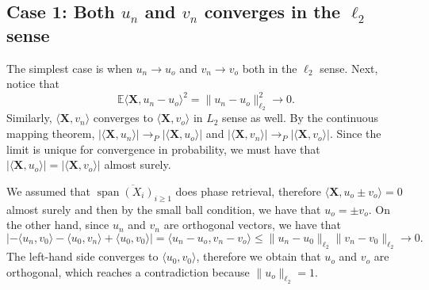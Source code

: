 \documentclass[a4paper,12pt]{amsart}
\numberwithin{equation}{section}
\newcommand{\X}{\mathbf X}
\DeclareMathOperator{\spn}{span}
\begin{document}
\subsection{Case 1: Both $u_n$ and $v_n$ converges in the $\ell_2$ sense}
The simplest case is when $u_n \rightarrow u_o$ and $v_n\rightarrow v_o$ both in the $\ell_2$ sense. Next, notice that 
\begin{equation*}
    \mathbb{E}\langle \X, u_n-u_o\rangle^2  = \|u_n-u_o\|_{\ell_2}^2 \rightarrow 0.
\end{equation*}
Similarly, $\langle \X,v_n\rangle$ converges to $\langle \X,v_o\rangle$ in $L_2$ sense as well. By the continuous mapping theorem, $|\langle \X,u_n\rangle| \rightarrow_{P} |\langle \X,u_o\rangle| $ and $|\langle \X,v_n\rangle| \rightarrow_{P} |\langle \X,v_o\rangle| $. Since the limit is unique for convergence in probability, we must have that $|\langle \X,u_o\rangle| = |\langle \X,v_o\rangle| $ almost surely.

We assumed that $\overline{\spn (X_i)_{i\ge 1}}$ does phase retrieval, therefore $\langle \X, u_o \pm v_o\rangle =0$ almost surely and then by the small ball condition, we have that $u_o = \pm v_o$. On the other hand, since $u_n$ and $v_n$ are orthogonal vectors, we have that
\begin{equation*}
|-\langle u_n,v_0\rangle - \langle u_0,v_n\rangle +\langle u_0,v_0\rangle|   = \langle u_n-u_o,v_n-v_o\rangle \le \|u_n-u_0\|_{\ell_2}\|v_n-v_0\|_{\ell_2} \rightarrow 0.
\end{equation*}
The left-hand side converges to $\langle u_0,v_0\rangle$, therefore we obtain that $u_o$ and $v_o$ are orthogonal, which reaches a contradiction because $\|u_o\|_{\ell_2} =1$.
\end{document}
